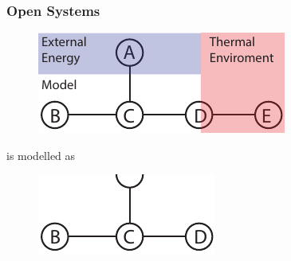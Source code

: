 \documentclass[11pt,reqno]{beamer}
\begin{document}
\begin{frame}
\frametitle{Open Systems}
\begin{figure}
\centering
\includegraphics{images/network_2.pdf}
\end{figure}
\centering
is modelled as
\begin{figure}
	\centering
\includegraphics{images/network_2a.pdf}
\end{figure}
\end{frame}
\end{document}
